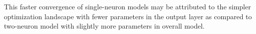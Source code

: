 \documentclass[11pt]{article}
\begin{document}
This faster convergence of single-neuron models may be attributed to the simpler optimization landscape with fewer parameters in the output layer as compared to two-neuron model with slightly more parameters in overall model.












\end{document}
